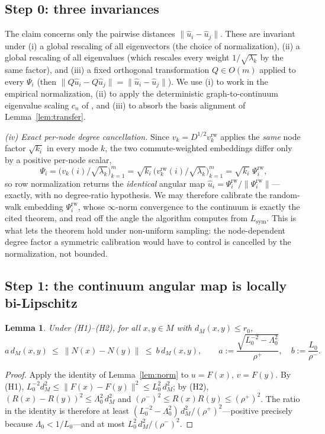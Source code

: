 \documentclass[11pt]{article}
\newtheorem{lemma}[theorem]{Lemma}
\theoremstyle{remark}
\begin{document}
\subsection*{Step 0: three invariances}
The claim concerns only the pairwise distances $\lVert\hat u_i-\hat u_j\rVert$.
These are invariant under (i) a global rescaling of all eigenvectors (the choice
of normalization), (ii) a global rescaling of all eigenvalues (which rescales
every weight $1/\sqrt{\lambda_k}$ by the same factor), and (iii) a fixed
orthogonal transformation $Q\in O(m)$ applied to every $\Psi_i$ (then
$\lVert Q\hat u_i-Q\hat u_j\rVert=\lVert\hat u_i-\hat u_j\rVert$). We use (i) to
work in the empirical normalization, (ii) to apply the deterministic
graph-to-continuum eigenvalue scaling $c_n$ of \cite{calder2022}, and (iii) to
absorb the basis alignment of Lemma~\ref{lem:transfer}.

\smallskip\noindent\emph{(iv) Exact per-node degree cancellation.} Since
$v_k=D^{1/2}v^{\mathrm{rw}}_k$ applies the \emph{same} node factor $\sqrt{k_i}$ in
every mode $k$, the two commute-weighted embeddings differ only by a positive
per-node scalar,
\[
\Psi_i=\big(v_k(i)/\sqrt{\lambda_k}\big)_{k=1}^m
=\sqrt{k_i}\,\big(v^{\mathrm{rw}}_k(i)/\sqrt{\lambda_k}\big)_{k=1}^m
=\sqrt{k_i}\;\Psi^{\mathrm{rw}}_i ,
\]
so row normalization returns the \emph{identical} angular map
$\hat u_i=\Psi^{\mathrm{rw}}_i/\lVert\Psi^{\mathrm{rw}}_i\rVert$---exactly, with no
degree-ratio hypothesis. We may therefore calibrate the random-walk embedding
$\Psi^{\mathrm{rw}}_i$, whose $\infty$-norm convergence to the continuum is
exactly the cited theorem, and read off the angle the algorithm computes from
$L_{\mathrm{sym}}$. This is what lets the theorem hold under non-uniform sampling:
the node-dependent degree factor a symmetric calibration would have to control is
cancelled by the normalization, not bounded.

\subsection*{Step 1: the continuum angular map is locally bi-Lipschitz}
\begin{lemma}\label{lem:contang}
Under \textup{(H1)--(H2)}, for all $x,y\in M$ with $d_M(x,y)\le r_0$,
\[
a\,d_M(x,y)\ \le\ \lVert N(x)-N(y)\rVert\ \le\ b\,d_M(x,y),\qquad
a:=\frac{\sqrt{L_0^{-2}-\Lambda_0^2}}{\rho^+},\quad b:=\frac{L_0}{\rho^-}.
\]
\end{lemma}
\begin{proof}
Apply the identity of Lemma~\ref{lem:norm} to $u=F(x)$, $v=F(y)$. By (H1),
$L_0^{-2}d_M^2\le\lVert F(x)-F(y)\rVert^2\le L_0^2\,d_M^2$; by (H2),
$(R(x)-R(y))^2\le\Lambda_0^2\,d_M^2$ and $(\rho^-)^2\le R(x)R(y)\le(\rho^+)^2$.
The ratio in the identity is therefore at least
$(L_0^{-2}-\Lambda_0^2)\,d_M^2/(\rho^+)^2$---positive precisely because
$\Lambda_0<1/L_0$---and at most $L_0^2\,d_M^2/(\rho^-)^2$.
\end{proof}
\end{document}
